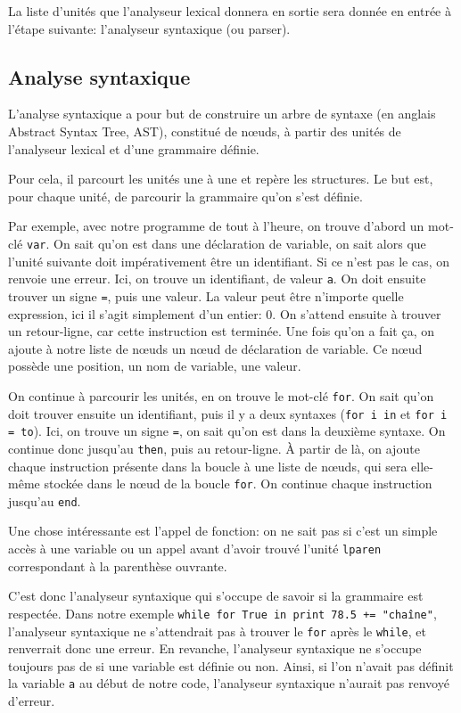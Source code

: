 \documentclass{article}
\begin{document}
La liste d’unités que l’analyseur lexical donnera en sortie sera donnée en entrée à l’étape
suivante\nobreakspace: l’analyseur syntaxique (ou parser).

\subsection{Analyse syntaxique}
L’analyse syntaxique a pour but de construire un arbre de syntaxe (en anglais Abstract Syntax
Tree, AST), constitué de nœuds, à partir des unités de l’analyseur lexical et d’une grammaire
définie.

Pour cela, il parcourt les unités une à une et repère les structures.
Le but est, pour chaque unité, de parcourir la grammaire qu’on s’est définie.

Par exemple, avec notre programme de tout à l’heure, on trouve d’abord un mot-clé \verb|var|. 
On sait qu’on est dans une déclaration de variable, on sait alors que l’unité suivante doit
impérativement être un identifiant. Si ce n’est pas le cas, on renvoie une erreur.
Ici, on trouve un identifiant, de valeur \verb|a|. On doit ensuite trouver un signe \verb|=|,
puis une valeur. La valeur peut être n’importe quelle expression, ici il s’agit simplement d’un
entier\nobreakspace: 0. On s’attend ensuite à trouver un retour-ligne, car cette instruction est terminée.
Une fois qu’on a fait ça, on ajoute à notre liste de nœuds un nœud de déclaration de variable. Ce
nœud possède une position, un nom de variable, une valeur.

On continue à parcourir les unités, en on trouve le mot-clé \verb|for|. On sait qu’on doit trouver
ensuite un identifiant, puis il y a deux syntaxes (\verb|for i in| et \verb|for i = to|). Ici, on trouve
un signe \verb|=|, on sait qu’on est dans la deuxième syntaxe. On continue donc jusqu’au \verb|then|,
puis au retour-ligne. À partir de là, on ajoute chaque instruction présente dans la boucle à une liste
de nœuds, qui sera elle-même stockée dans le nœud de la boucle \verb|for|. On continue chaque instruction
jusqu’au \verb|end|.

Une chose intéressante est l’appel de fonction\nobreakspace: on ne sait pas si c’est un simple accès à une
variable ou un appel avant d’avoir trouvé l’unité \verb|lparen| correspondant à la parenthèse ouvrante.

C’est donc l’analyseur syntaxique qui s’occupe de savoir si la grammaire est respectée. Dans notre
exemple \verb|while for True in print 78.5 += "chaîne"|, l’analyseur syntaxique
ne s’attendrait pas à trouver le \verb|for| après le \verb|while|, et renverrait donc une erreur.
En revanche, l’analyseur syntaxique ne s’occupe toujours pas de si une variable est définie ou non.
Ainsi, si l’on n’avait pas définit la variable \verb|a| au début de notre code, l’analyseur syntaxique
n’aurait pas renvoyé d’erreur.
\end{document}
